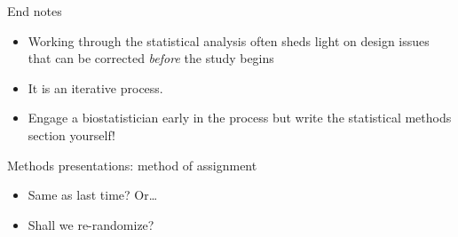 \documentclass[ignorenonframetext,]{beamer}
\newenvironment{Shaded}{\begin{snugshade}}{\end{snugshade}}
\newcommand{\DataTypeTok}[1]{\textcolor[rgb]{0.13,0.29,0.53}{#1}}
\newcommand{\DecValTok}[1]{\textcolor[rgb]{0.00,0.00,0.81}{#1}}
\newcommand{\KeywordTok}[1]{\textcolor[rgb]{0.13,0.29,0.53}{\textbf{#1}}}
\newcommand{\NormalTok}[1]{#1}
\newcommand{\OperatorTok}[1]{\textcolor[rgb]{0.81,0.36,0.00}{\textbf{#1}}}
\newcommand{\OtherTok}[1]{\textcolor[rgb]{0.56,0.35,0.01}{#1}}
\newcommand{\StringTok}[1]{\textcolor[rgb]{0.31,0.60,0.02}{#1}}
\providecommand{\tightlist}{%
  \setlength{\itemsep}{0pt}\setlength{\parskip}{0pt}}
\begin{document}
\begin{frame}{End notes}
\protect\hypertarget{end-notes}{}

\begin{itemize}
\item
  Working through the statistical analysis often sheds light on design
  issues that can be corrected \emph{before} the study begins
\item
  It is an iterative process.
\item
  Engage a biostatistician early in the process but write the
  statistical methods section yourself!
\end{itemize}

\end{frame}

\begin{frame}[fragile]{Methods presentations: method of assignment}
\protect\hypertarget{methods-presentations-method-of-assignment}{}

\begin{itemize}
\tightlist
\item
  Same as last time? Or\ldots{}
\item
  Shall we re-randomize?
\end{itemize}

\begin{Shaded}
\end{Shaded}

\end{frame}
\end{document}
